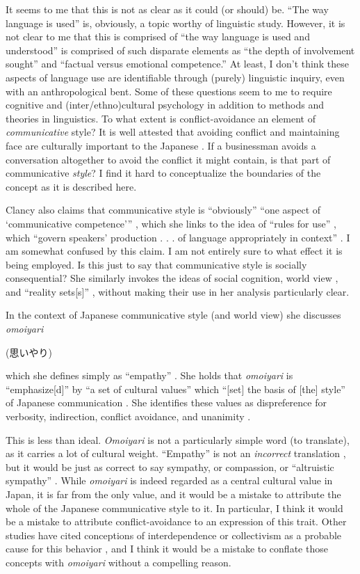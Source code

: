 \documentclass[man,12pt,natbib]{apa6}
\begin{document}
It seems to me that this is not as clear as it could (or should) be.  ``The way
language is used'' is, obviously, a topic worthy of linguistic study. However,
it is not clear to me that this is comprised of ``the way language is used and
understood'' is comprised of such disparate elements as ``the depth of
involvement sought'' and ``factual versus emotional competence.'' At least, I
don't think these aspects of language use are identifiable through (purely)
linguistic inquiry, even with an anthropological bent. Some of these questions
seem to me to require cognitive and (inter/ethno)cultural psychology in
addition to methods and theories in linguistics. To what extent is
conflict-avoidance an element of \emph{communicative} style? It is well
attested that avoiding conflict and maintaining face are culturally important
to the Japanese \citep{Benedict46,Ohbuchi94}. If a businessman avoids a
conversation altogether to avoid the conflict it might contain, is that part of
communicative \emph{style}? I find it hard to conceptualize the boundaries of
the concept as it is described here.

Clancy also claims that communicative style is ``obviously'' ``one aspect of
`communicative competence''' \citep[p.~213]{Clancy87}, which she links to the
idea of ``rules for use'' \citep{Hymes72}, which ``govern speakers' production
. . .  of language appropriately in context'' \citep[p.~213]{Clancy87}.  I am
somewhat confused by this claim. I am not entirely sure to what effect it is
being employed. Is this just to say that communicative style is socially
consequential?  She similarly invokes the ideas of social cognition, world view
\citep{Whorf56}, and ``reality sets[s]'' \citep{Scollon81}, without making
their use in her analysis particularly clear.

In the context of Japanese communicative style (and world view) she discusses
\emph{omoiyari} \begin{CJK}{UTF8}{min}(思いやり)\end{CJK} which she defines
simply as ``empathy'' \citep[p.~214]{Clancy87}. She holds that \emph{omoiyari}
is ``emphasize[d]'' by ``a set of cultural values'' which ``[set] the basis of
[the] style'' of Japanese communication \cite[pp.~213-214]{Clancy87}. She
identifies these values as dispreference for verbosity, indirection, conflict
avoidance, and unanimity \citep[p.~214-216]{Clancy87}.

This is less than ideal. \emph{Omoiyari} is not a particularly simple word (to
translate), as it carries a lot of cultural weight. ``Empathy'' is not an
\emph{incorrect} translation \citep{Travis98}, but it would be just as correct
to say sympathy, or compassion, or ``altruistic sympathy'' \citep{Hara06}.
While \emph{omoiyari} is indeed regarded as a central cultural value in Japan,
it is far from the only value, and it would be a mistake to attribute the whole
of the Japanese communicative style to it. In particular, I think it would be a
mistake to attribute conflict-avoidance to an expression of this trait. Other
studies have cited conceptions of interdependence or collectivism as a probable
cause for this behavior \citep{Ohbuchi94}, and I think it would be a mistake to
conflate those concepts with \emph{omoiyari} without a compelling reason.
\end{document}
